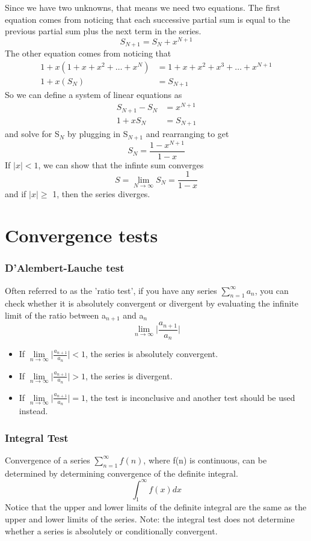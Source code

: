 \documentclass{article}
\newcommand{\be}{\begin{equation}}
\newcommand{\ee}{\end{equation}}
\begin{document}
Since we have two unknowns, that means we need two equations.
The first equation comes from noticing that each successive partial sum is equal to the previous partial sum plus the next term in the series.
\be
S_{N+1} = S_N + x^{N+1}
\ee
The other equation comes from noticing that
\be
\begin{split}
1 + x(1 + x + x^2 + \hdots + x^N) &= 1 + x + x^2 + x^3 + \hdots + x^{N+1} \\
1 + x (S_N) &= S_{N+1}
\end{split}
\ee
So we can define a system of linear equations as
\be
\begin{split}
S_{N+1} - S_N &= x^{N+1} \\
1 + xS_N &= S_{N+1}
\end{split}
\ee
and solve for S$_N$ by plugging in S$_{N+1}$ and rearranging to get
\be
S_N = \frac{1-x^{N+1}}{1-x}
\ee
If $|x| < 1$, we can show that the infinte sum converges
\be
S = \lim_{N \to \infty}S_N = \frac{1}{1-x}
\ee
and if $|x|\geq$ 1, then the series diverges.
\section*{Convergence tests}
\subsubsection*{D'Alembert-Lauche test}
Often referred to as the 'ratio test', if you have any series $\sum\limits_{n=1}^{\infty} a_n$, you can check whether it is absolutely convergent or divergent by evaluating the infinite limit of the ratio between a$_{n+1}$ and a$_n$
\be
\lim_{n \to \infty} \Big| \frac{a_{n+1}}{a_n} \Big|
\ee
\begin{itemize}
  \item If $\lim\limits_{n \to \infty} \Big| \frac{a_{n+1}}{a_n} \Big| < 1$, the series is absolutely convergent.
  \item If $\lim\limits_{n \to \infty} \Big| \frac{a_{n+1}}{a_n} \Big| > 1$, the series is divergent.
  \item If $\lim\limits_{n \to \infty} \Big| \frac{a_{n+1}}{a_n} \Big| = 1$, the test is inconclusive and another test should be used instead.
\end{itemize}
\subsubsection*{Integral Test}
Convergence of a series $\sum\limits_{n=1}^{\infty} f(n)$, where f(n) is continuous, can be determined by determining convergence of the definite integral.
\be
\int_{1}^{\infty}f(x)dx
\ee
Notice that the upper and lower limits of the definite integral are the same as the upper and lower limits of the series.
Note: the integral test does not determine whether a series is absolutely or conditionally convergent.
\end{document}
